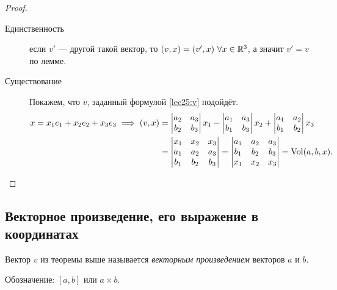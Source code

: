 \begin{proof}~
    \begin{description}
    \item[Единственность] если $v'$ --- другой такой вектор, то $(v, x) = (v', x) \ \forall x \in \RR^3$, а значит $v' = v$ по лемме.
    \item[Существование] Покажем, что $v$, заданный формулой \eqref{lec25:v} подойдёт.
        \begin{align*}
            x = x_1 e_1 + x_2 e_2 + x_3 e_3 \implies (v, x) &= \begin{vmatrix} 
                a_2 & a_3 \\
                b_2 & b_3
            \end{vmatrix} x_1 - \begin{vmatrix} 
                a_1 & a_3 \\
                b_1 & b_3
            \end{vmatrix} x_2 + \begin{vmatrix} 
                a_1 & a_2 \\
                b_1 & b_2
                \end{vmatrix} x_3 \\ &= \begin{vmatrix} 
                x_1 & x_2 & x_3 \\
                a_1 & a_2 & a_3 \\
                b_1 & b_2 & b_3
            \end{vmatrix} = \begin{vmatrix} 
                a_1 & a_2 & a_3 \\
                b_1 & b_2 & b_3 \\
                x_1 & x_2 & x_3
            \end{vmatrix} = \operatorname{\mathop{\mathrm{Vol}}}(a, b, x)
        .\end{align*}
    \end{description}
\end{proof}


\subsection{Векторное произведение, его выражение в координатах}

\begin{definition}
    Вектор $v$ из теоремы выше называется \textit{векторным произведением} векторов $a$ и $b$.

    Обозначение: $[a, b]$ или $a \times b$.
\end{definition}



